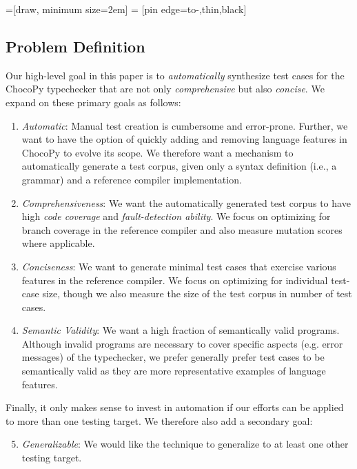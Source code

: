 \documentclass[conference]{IEEEtran}
\begin{document}
=[draw, minimum size=2em]
 = [pin edge={to-,thin,black}]



\subsection{Problem Definition}
\label{sec:motivation-problem}



Our high-level goal in this paper is to \emph{automatically} synthesize test cases for the ChocoPy typechecker that are not only \emph{comprehensive} but also \emph{concise}. We expand on these primary goals as follows:

\begin{enumerate}
    \item \emph{Automatic}: Manual test creation is cumbersome and error-prone. Further, we want to have the option of quickly adding and removing language features in ChocoPy to evolve its scope. We therefore want a mechanism to automatically generate a test corpus, given only a syntax definition (i.e., a grammar) and a reference compiler implementation.
    \item \emph{Comprehensiveness}: We want the automatically generated test corpus to have high \emph{code coverage} and \emph{fault-detection ability}. We focus on optimizing for branch coverage in the reference compiler and also measure mutation scores where applicable.
    \item \emph{Conciseness}: We want to generate minimal test cases that exercise various features in the reference compiler. We focus on optimizing for individual test-case size, though we also measure the size of the test corpus in number of test cases.
    \item \emph{Semantic Validity}: We want a high fraction of semantically valid programs. Although invalid programs are necessary to cover specific aspects (e.g. error messages) of the typechecker, we prefer generally prefer test cases to be semantically valid as they are more representative examples of language features. 
\end{enumerate}

Finally, it only makes sense to invest in automation if our efforts can be applied to more than one testing target. We therefore also add a secondary goal:

\begin{enumerate}
    \setcounter{enumi}{4}
    \item \emph{Generalizable}: We would like the technique to generalize to at least one other testing target.
\end{enumerate}
\end{document}
